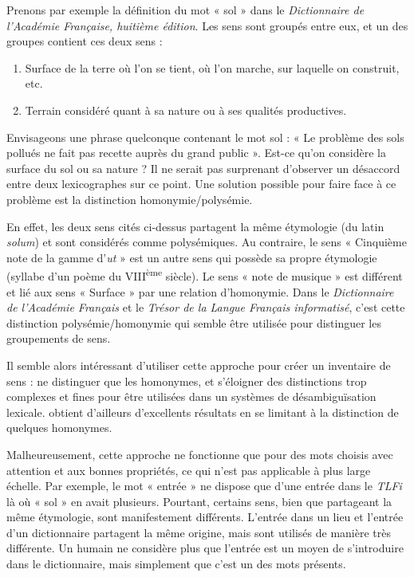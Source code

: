 Prenons par exemple la définition du mot « sol » dans le \textit{Dictionnaire
de l'Académie Française, huitième édition}. Les sens sont groupés entre eux, et
un des groupes contient ces deux sens :

\begin{enumerate}

  \item Surface de la terre où l'on se tient, où l'on marche, sur laquelle on
      construit, etc.

  \item Terrain considéré quant à sa nature ou à ses qualités productives.

\end{enumerate}

Envisageons une phrase quelconque contenant le mot sol : « Le problème des sols
pollués ne fait pas recette auprès du grand public ». Est-ce qu'on considère la
surface du sol ou sa nature ? Il ne serait pas surprenant d'observer un
désaccord entre deux lexicographes sur ce point. Une solution possible pour
faire face à ce problème est la distinction homonymie/polysémie.

En effet, les deux sens cités ci-dessus partagent la même étymologie (du latin
\textit{solum}) et sont considérés comme polysémiques. Au contraire, le sens «
Cinquième note de la gamme d'\textit{ut} » est un autre sens qui possède sa
propre étymologie (syllabe d'un poème du VIII\textsuperscript{ème} siècle). Le
sens « note de musique » est différent et lié aux sens « Surface » par une
relation d'homonymie. Dans le \textit{Dictionnaire de l'Académie Français} et
le \textit{Trésor de la Langue Français informatisé}, c'est cette distinction
polysémie/homonymie qui semble être utilisée pour distinguer les groupements de
sens.

Il semble alors intéressant d'utiliser cette approche pour créer un inventaire
de sens : ne distinguer que les homonymes, et s'éloigner des distinctions trop
complexes et fines pour être utilisées dans un systèmes de désambiguïsation
lexicale. \cite{yarowsky1995unsupervised} obtient d'ailleurs d'excellents
résultats en se limitant à la distinction de quelques homonymes.

Malheureusement, cette approche ne fonctionne que pour des mots choisis avec
attention et aux bonnes propriétés, ce qui n'est pas applicable à plus large
échelle. Par exemple, le mot « entrée » ne dispose que d'une entrée dans le
\textit{TLFi} là où « sol » en avait plusieurs. Pourtant, certains sens, bien
que partageant la même étymologie, sont manifestement différents. L'entrée dans
un lieu et l'entrée d'un dictionnaire partagent la même origine, mais sont
utilisés de manière très différente. Un humain ne considère plus que l'entrée
est un moyen de s'introduire dans le dictionnaire, mais simplement que c'est un
des mots présents.

